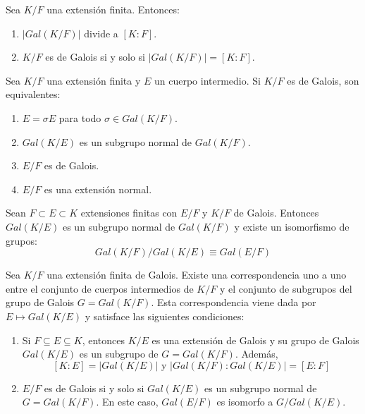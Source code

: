 \begin{theorem}
    Sea $K/F$ una extensión finita. Entonces:
    \begin{enumerate}
        \item $|Gal(K/F)|$ divide a $[K : F]$.
        \item $K/F$ es de Galois si y solo si $|Gal(K/F)| = [K : F]$.
    \end{enumerate}
\end{theorem}

\begin{theorem}
    Sea $K/F$ una extensión finita y $E$ un cuerpo intermedio. Si $K/F$ es de Galois, son equivalentes:
    \begin{enumerate}
        \item $E = \sigma E$ para todo $\sigma \in Gal(K/F)$.
        \item $Gal(K/E)$ es un subgrupo normal de $Gal(K/F)$.
        \item $E/F$ es de Galois.
        \item $E/F$ es una extensión normal.
    \end{enumerate}
\end{theorem}

\begin{theorem}
    Sean $F \subset E \subset K$ extensiones finitas con $E/F$ y $K/F$ de Galois.
    Entonces $Gal(K/E)$ es un subgrupo normal de $Gal(K/F)$ y existe un isomorfismo de grupos:
    $$Gal(K/F)/Gal(K/E) \equiv Gal(E/F)$$
\end{theorem}

\begin{theorem}
    Sea $K/F$ una extensión finita de Galois.
    Existe una correspondencia uno a uno entre el conjunto de cuerpos intermedios de $K/F$ y el conjunto de subgrupos del grupo de Galois $G = Gal(K/F)$.
    Esta correspondencia viene dada por $E \mapsto Gal(K/E)$ y satisface las siguientes condiciones:
    \begin{enumerate}
        \item Si $F \subseteq E \subseteq K$, entonces $K/E$ es una extensión de Galois y su grupo de Galois $Gal(K/E)$ es un subgrupo de $G = Gal(K/F)$. Además, $$[K : E] = |Gal(K/E)| \text{ y } |Gal(K/F) : Gal(K/E)| = [E : F]$$
        \item $E/F$ es de Galois si y solo si $Gal(K/E)$ es un subgrupo normal de $G = Gal(K/F)$. En este caso, $Gal(E/F)$ es isomorfo a $G/Gal(K/E)$.
    \end{enumerate}
\end{theorem}